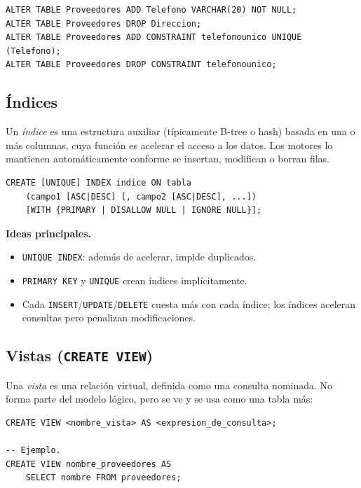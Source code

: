 \documentclass[11pt,a4paper]{article}
\begin{document}
\begin{lstlisting}
ALTER TABLE Proveedores ADD Telefono VARCHAR(20) NOT NULL;
ALTER TABLE Proveedores DROP Direccion;
ALTER TABLE Proveedores ADD CONSTRAINT telefonounico UNIQUE (Telefono);
ALTER TABLE Proveedores DROP CONSTRAINT telefonounico;
\end{lstlisting}

\subsection{Índices}

Un \emph{índice} es una estructura auxiliar (típicamente B-tree o hash)
basada en una o más columnas, cuya función es acelerar el acceso a los
datos. Los motores lo mantienen automáticamente conforme se insertan,
modifican o borran filas.

\begin{lstlisting}
CREATE [UNIQUE] INDEX indice ON tabla
    (campo1 [ASC|DESC] [, campo2 [ASC|DESC], ...])
    [WITH {PRIMARY | DISALLOW NULL | IGNORE NULL}];
\end{lstlisting}

\textbf{Ideas principales.}
\begin{itemize}
    \item \texttt{UNIQUE INDEX}: además de acelerar, impide duplicados.
    \item \texttt{PRIMARY KEY} y \texttt{UNIQUE} crean índices implícitamente.
    \item Cada \texttt{INSERT}/\texttt{UPDATE}/\texttt{DELETE} cuesta más con
    cada índice; los índices aceleran consultas pero penalizan modificaciones.
\end{itemize}

\subsection{Vistas (\texttt{CREATE VIEW})}

Una \emph{vista} es una relación virtual, definida como una consulta
nominada. No forma parte del modelo lógico, pero se ve y se usa como una
tabla más:

\begin{lstlisting}
CREATE VIEW <nombre_vista> AS <expresion_de_consulta>;

-- Ejemplo.
CREATE VIEW nombre_proveedores AS
    SELECT nombre FROM proveedores;
\end{lstlisting}
\end{document}

